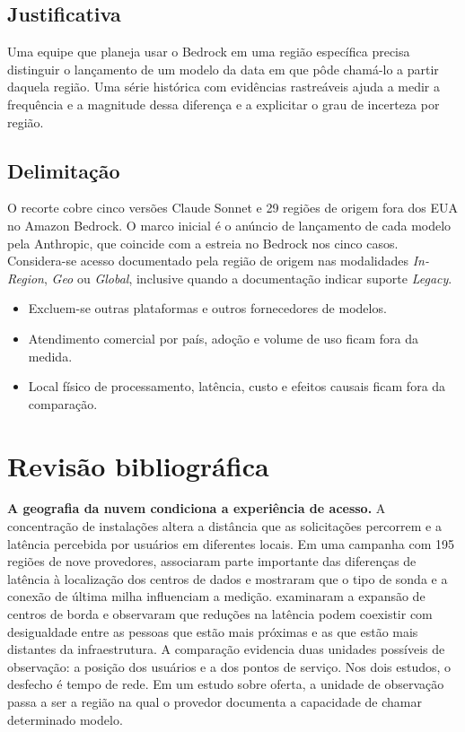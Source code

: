 \documentclass[12pt,a4paper]{article}
\begin{document}
\subsection{Justificativa}

Uma equipe que planeja usar o Bedrock em uma região específica precisa distinguir o lançamento de um modelo da data em que pôde chamá-lo a partir daquela região. Uma série histórica com evidências rastreáveis ajuda a medir a frequência e a magnitude dessa diferença e a explicitar o grau de incerteza por região.

\subsection{Delimitação}

O recorte cobre cinco versões Claude Sonnet e 29 regiões de origem fora dos EUA no Amazon Bedrock. O marco inicial é o anúncio de lançamento de cada modelo pela Anthropic, que coincide com a estreia no Bedrock nos cinco casos. Considera-se acesso documentado pela região de origem nas modalidades \emph{In-Region}, \emph{Geo} ou \emph{Global}, inclusive quando a documentação indicar suporte \emph{Legacy}.

\begin{itemize}
  \setlength{\itemsep}{0pt}
  \setlength{\parsep}{0pt}
  \item Excluem-se outras plataformas e outros fornecedores de modelos.
  \item Atendimento comercial por país, adoção e volume de uso ficam fora da medida.
  \item Local físico de processamento, latência, custo e efeitos causais ficam fora da comparação.
\end{itemize}

\clearpage
\section{Revisão bibliográfica}

\textbf{A geografia da nuvem condiciona a experiência de acesso.}
A concentração de instalações altera a distância que as solicitações percorrem e a latência percebida por usuários em diferentes locais. Em uma campanha com 195 regiões de nove provedores, \citet[seções 3--5]{dang2021} associaram parte importante das diferenças de latência à localização dos centros de dados e mostraram que o tipo de sonda e a conexão de última milha influenciam a medição. \citet[seções 3--5]{martin2023} examinaram a expansão de centros de borda e observaram que reduções na latência podem coexistir com desigualdade entre as pessoas que estão mais próximas e as que estão mais distantes da infraestrutura. A comparação evidencia duas unidades possíveis de observação: a posição dos usuários e a dos pontos de serviço. Nos dois estudos, o desfecho é tempo de rede. Em um estudo sobre oferta, a unidade de observação passa a ser a região na qual o provedor documenta a capacidade de chamar determinado modelo.
\end{document}
